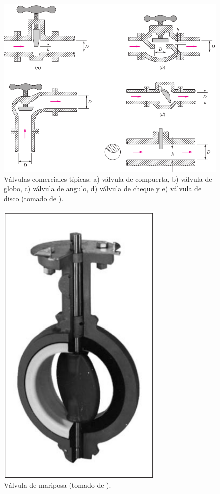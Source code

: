 \documentclass[11pt, oneside]{article}
\begin{document}
\begin{figure}[h]
\centering
\includegraphics[width=12cm]{acce0.png}
\caption{V\'alvulas comerciales t\'ipicas: a) v\'alvula de compuerta, b) v\'alvula de globo, c) v\'alvula de angulo, d) v\'alvula de cheque y e) v\'alvula de disco (tomado de \cite{white1990fluid}).}
\label{acce0}
\end{figure}

\begin{figure}[h]
\centering
\includegraphics[width=8cm]{acce01.png}
\caption{V\'alvula de mariposa (tomado de \cite{white1990fluid}).}
\label{acce01}
\end{figure}
\end{document}
